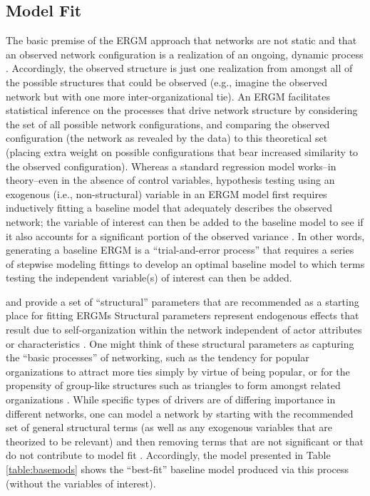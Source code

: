 \documentclass[12pt,a4paper,titlepage]{article}
\begin{document}
\subsection{Model Fit}

The basic premise of the ERGM approach that networks are not static and that an observed network configuration is a realization of an ongoing, dynamic process \parencite{lusher2013-a}. Accordingly, the observed structure is just one realization from amongst all of the possible structures that could be observed (e.g., imagine the observed network but with one more inter-organizational tie). An ERGM facilitates statistical inference on the processes that drive network structure by considering the set of all possible network configurations, and comparing the observed configuration (the network as revealed by the data) to this theoretical set (placing extra weight on possible configurations that bear increased similarity to the observed configuration). Whereas a standard regression model works--in theory--even in the absence of control variables, hypothesis testing using an exogenous (i.e., non-structural) variable in an ERGM model first requires inductively fitting a baseline model that adequately describes the observed network; the variable of interest can then be added to the baseline model to see if it also accounts for a significant portion of the observed variance \parencite{kolaczyk2009,lusher2013-a}. In other words, generating a baseline ERGM is a “trial-and-error process” \parencite[184]{lusher2013-a} that requires a series of stepwise modeling fittings to develop an optimal baseline model to which terms testing the independent variable(s) of interest can then be added. 

\textcite{snijders2006} and \textcite{lusher2013-a} provide a set of ``structural'' parameters that are recommended as a starting place for fitting ERGMs Structural parameters represent endogenous effects that result due to self-organization within the network independent of actor attributes or characteristics \parencite{lusher2013-a}. One might think of these structural parameters as capturing the “basic processes” of networking, such as the tendency for popular organizations to attract more ties simply by virtue of being popular, or for the propensity of group-like structures such as triangles to form amongst related organizations \parencite{lusher2013-a}. While specific types of drivers are of differing importance in different networks, one can model a network by starting with the recommended set of general structural terms (as well as any exogenous variables that are theorized to be relevant) and then removing terms that are not significant or that do not contribute to model fit \parencite{snijders2006}. Accordingly, the model presented in Table \ref{table:basemods} shows the “best-fit” baseline model produced via this process (without the variables of interest). 
\end{document}
